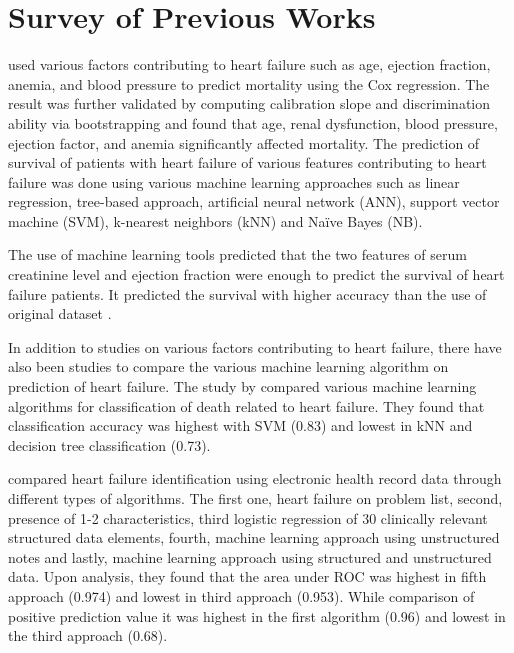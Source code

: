 \documentclass{article}
\begin{document}
\section{Survey of Previous Works}

\citet{ahmad2017survival} used various factors contributing to heart failure such as age, ejection fraction, anemia, and blood pressure  to predict mortality using the Cox regression. The result was further validated by computing calibration slope and discrimination ability via bootstrapping and found that age, renal dysfunction, blood pressure, ejection factor, and anemia significantly affected mortality. The prediction of survival of patients with heart failure of various features contributing to heart failure was done using various machine learning approaches such as linear regression, tree-based approach, artificial neural network (ANN), support vector machine (SVM), k-nearest neighbors (kNN) and Na\"ive Bayes (NB). 

The use of machine learning tools predicted that the two features of serum creatinine level and ejection fraction were enough to predict the survival of heart failure patients. It predicted the survival with higher accuracy than the use of original dataset \citep{chicco2020machine}.

In addition to studies on various factors contributing to heart failure, there have also been studies to compare the various machine learning algorithm on prediction of heart failure. The study by \citet{gurfidan2021classification} compared various machine learning algorithms for classification of death related to heart failure. They found that classification accuracy was highest with SVM (0.83) and lowest in kNN and decision tree classification (0.73). 

\citet{blecker2016comparison} compared heart failure identification using electronic health record data through different types of algorithms.
The first one, heart failure on problem list, second, presence of 1-2 characteristics, third logistic regression of 30 clinically relevant structured data elements, fourth, machine learning approach using unstructured notes and lastly, machine learning approach using structured and unstructured data. Upon analysis, they found that the area under ROC was highest in fifth approach (0.974) and lowest in third approach (0.953). While comparison of positive prediction value it was highest in the first algorithm (0.96) and lowest in the third approach (0.68).
\end{document}
